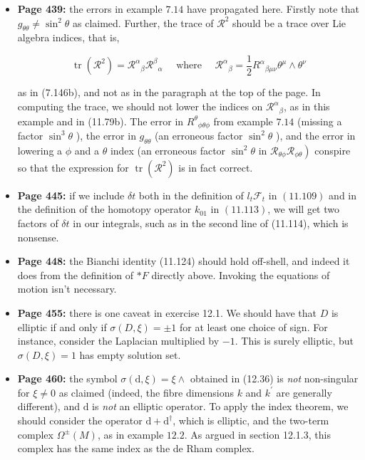 \documentclass{article}
\begin{document}
\begin{itemize}
\item[] {\bf  Page 439:} the errors in example $7.14$ have propagated here. Firstly note that $g_{\theta \theta} \neq \sin ^{2} \theta$ as claimed. Further, the trace of $\mathcal{R}^{2}$ should be a trace over Lie algebra indices, that is,

\[
\operatorname{tr}\left(\mathcal{R}^{2}\right)=\mathcal{R}^{\alpha}{}_{\beta} \mathcal{R}^{\beta}{}_{\alpha} \quad \text { where } \quad \mathcal{R}^{\alpha}{}_{\beta}=\frac{1}{2} R^{\alpha}{}_{\beta \mu \nu} \theta^{\mu} \wedge \theta^{\nu}
\]

as in (7.146b), and not as in the paragraph at the top of the page. In computing the trace, we should not lower the indices on $\mathcal{R}^{\alpha}{}_{\beta}$, as in this example and in (11.79b). The error in $R^{\theta}{}_{\phi \theta \phi}$ from example $7.14$ (missing a factor $\sin ^{3} \theta$ ), the error in $g_{\theta \theta}$ (an erroneous factor $\sin ^{2} \theta$ ), and the error in lowering a $\phi$ and a $\theta$ index (an erroneous factor $\sin ^{2} \theta$ in $\left.\mathcal{R}_{\theta \phi} \mathcal{R}_{\phi \theta}\right)$ conspire so that the expression for $\operatorname{tr}\left(\mathcal{R}^{2}\right)$ is in fact correct.

\item[] {\bf Page 445:} if we include $\delta t$ both in the definition of $l_{t} \mathcal{F}_{t}$ in $(11.109)$ and in the definition of the homotopy operator $k_{01}$ in $(11.113)$, we will get two factors of $\delta t$ in our integrals, such as in the second line of (11.114), which is nonsense.

\item[] {\bf  Page 448:} the Bianchi identity (11.124) should hold off-shell, and indeed it does from the definition of $* F$ directly above. Invoking the equations of motion isn't necessary.

\item[] {\bf  Page 455:} there is one caveat in exercise 12.1. We should have that $D$ is elliptic if and only if $\sigma(D, \xi)=\pm 1$ for at least one choice of sign. For instance, consider the Laplacian multiplied by $-1$. This is surely elliptic, but $\sigma(D, \xi)=1$ has empty solution set.

\item[] {\bf  Page 460:} the symbol $\sigma(\mathrm{d}, \xi)=\xi \wedge$ obtained in (12.36) is \emph{not} non-singular for $\xi \neq 0$ as claimed (indeed, the fibre dimensions $k$ and $k^{\prime}$ are generally different), and $\mathrm{d}$ is \emph{not} an elliptic operator. To apply the index theorem, we should consider the operator $\mathrm{d}+\mathrm{d}^{\dagger}$, which is elliptic, and the two-term complex $\Omega^{\pm}(M)$, as in example $12.2$. As argued in section 12.1.3, this complex has the same index as the de Rham complex.


\end{itemize}
\end{document}
